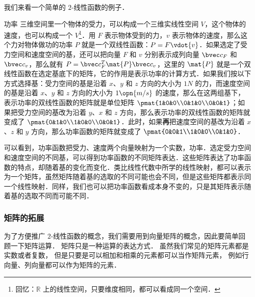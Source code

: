 我们来看一个简单的 $2$-线性函数的例子．

\begin{example}{功率}
三维空间里一个物体的受力，可以构成一个三维实线性空间 $V$，这个物体的速度，也可以构成一个 $V$\footnote{回忆：$\mathbb{R}$ 上的线性空间，只要维度相同，都可以看成同一个空间．}．用 ${F}$ 表示物体受到的力，${v}$ 表示物体的速度，那么这个力对物体做功的功率 $P$ 就是一个双线性函数：$P={F}\vdot{v}$．如果选定了受力空间和速度空间的基，还可以把向量 ${F}$ 和 ${v}$ 分别表示成列向量 $\bvec c_F$ 和 $\bvec c_v$，那么就有 $P=\bvec c^T_F\mat {P}\bvec c_v$，这里的 $\mat{P}$ 就是一个双线性函数在选定基底下的矩阵，它的作用是表示功率的计算方式．如果我们按以下方式选择基：受力空间的基是沿着 $x$、$y$ 和 $z$ 方向的大小为 $1N$ 的力，而速度空间的基是沿着 $x$、$y$ 和 $z$ 方向的大小为 $1\opn{m/s}$ 的速度，那么在这两组基下，表示功率的双线性函数的矩阵就是单位矩阵 $\pmat{1&0&0\\0&1&0\\0&0&1}$；如果把受力空间的基改为沿着 $y$、$x$ 和 $z$ 方向，那么表示功率的双线性函数的矩阵就变成了 $\pmat{0&1&0\\1&0&0\\0&0&1}$．此时，如果\textbf{再}把速度空间的基改为沿着 $x$、$z$ 和 $y$ 方向，那么功率函数的矩阵就变成了 $\pmat{0&0&1\\1&0&0\\0&1&0}$．
\end{example}

可以看到，功率函数把受力、速度两个向量映射为一个实数，功率．选定受力空间和速度空间的不同基，可以得到功率函数的不同矩阵表达．这些矩阵表达了功率函数的特点，却随着基的变化而变化．类比线性代数中所学的线性映射，都可以表示为一个矩阵，虽然矩阵随着基的选取的不同可能也会不同，但是这些矩阵都表示同一个线性映射．同样，我们也可以把功率函数看成本身不变的，只是其矩阵表示随着基的选取不同而可能不同．

\subsubsection{矩阵的拓展}

为了方便推广 $2$-线性函数的概念，我们需要用到向量矩阵的概念，因此要简单回顾一下矩阵运算． 矩阵只是一种运算的表达方式． 虽然我们常见的矩阵元素都是实数或者复数， 但是只要是可以相加和相乘的元素都可以当作矩阵元素， 例如行向量、列向量都可以作为矩阵的元素．

